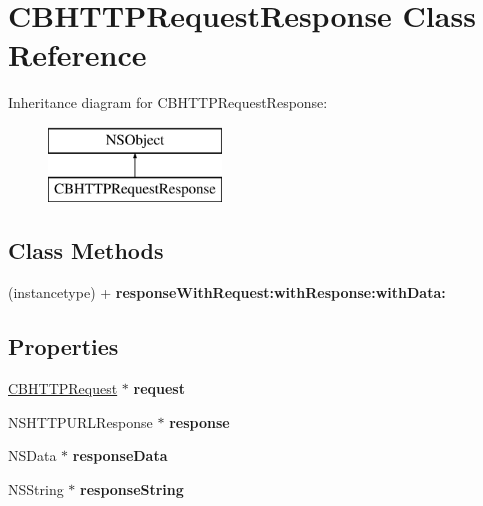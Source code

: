 \hypertarget{interface_c_b_h_t_t_p_request_response}{\section{C\+B\+H\+T\+T\+P\+Request\+Response Class Reference}
\label{interface_c_b_h_t_t_p_request_response}
}
Inheritance diagram for C\+B\+H\+T\+T\+P\+Request\+Response\+:\begin{figure}[H]
\begin{center}
\leavevmode
\includegraphics[height=2.000000cm]{interface_c_b_h_t_t_p_request_response}
\end{center}
\end{figure}
\subsection*{Class Methods}
\begin{DoxyCompactItemize}
\item 
\hypertarget{interface_c_b_h_t_t_p_request_response_adf76e986c5ec2fb394c27f23331fb680}{(instancetype) + {\bfseries response\+With\+Request\+:with\+Response\+:with\+Data\+:}}\label{interface_c_b_h_t_t_p_request_response_adf76e986c5ec2fb394c27f23331fb680}

\end{DoxyCompactItemize}
\subsection*{Properties}
\begin{DoxyCompactItemize}
\item 
\hypertarget{interface_c_b_h_t_t_p_request_response_a47ccbfe884900d45f4f8e0a0b4fafea7}{\hyperlink{interface_c_b_h_t_t_p_request}{C\+B\+H\+T\+T\+P\+Request} $\ast$ {\bfseries request}}\label{interface_c_b_h_t_t_p_request_response_a47ccbfe884900d45f4f8e0a0b4fafea7}

\item 
\hypertarget{interface_c_b_h_t_t_p_request_response_adf582af8f5400ad6fbe784b87e1b2eaf}{N\+S\+H\+T\+T\+P\+U\+R\+L\+Response $\ast$ {\bfseries response}}\label{interface_c_b_h_t_t_p_request_response_adf582af8f5400ad6fbe784b87e1b2eaf}

\item 
\hypertarget{interface_c_b_h_t_t_p_request_response_a1006216c5a63489696bffc15fffba1b3}{N\+S\+Data $\ast$ {\bfseries response\+Data}}\label{interface_c_b_h_t_t_p_request_response_a1006216c5a63489696bffc15fffba1b3}

\item 
\hypertarget{interface_c_b_h_t_t_p_request_response_ac90c310149a1720766bcbe8f0d2e429d}{N\+S\+String $\ast$ {\bfseries response\+String}}\label{interface_c_b_h_t_t_p_request_response_ac90c310149a1720766bcbe8f0d2e429d}

\end{DoxyCompactItemize}


